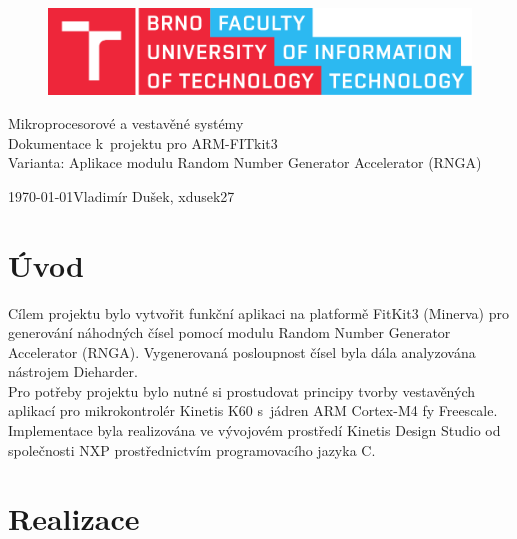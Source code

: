\documentclass[11pt, a4paper, titlepage]{article}
\begin{document}
\begin{titlepage}
    \begin{center}
    \begin{figure}[htb]
    \centering
    \includegraphics[width=0.85\hsize]{images/fitlogo.pdf}
    \end{figure}
    {\Huge Mikroprocesorové a vestavěné systémy} \\
    \bigskip
    {\LARGE Dokumentace k~projektu pro ARM-FITkit3} \\
    \bigskip
    {\Large Varianta: Aplikace modulu Random Number Generator Accelerator (RNGA)}
    \end{center}
    {\Large \today \hfill Vladimír Dušek, xdusek27}
\end{titlepage}


\tableofcontents
\newpage


\section{Úvod}

Cílem projektu bylo vytvořit funkční aplikaci na platformě FitKit3 (Minerva) pro generování náhodných čísel pomocí modulu Random Number Generator Accelerator (RNGA). Vygenerovaná posloupnost čísel byla dála analyzována nástrojem Dieharder. \\

Pro potřeby projektu bylo nutné si prostudovat principy tvorby vestavěných aplikací pro mikrokontrolér Kinetis K60 s~jádren ARM Cortex-M4 fy Freescale. Implementace byla realizována ve vývojovém prostředí Kinetis Design Studio od společnosti NXP prostřednictvím programovacího jazyka C.


\section{Realizace}
\end{document}
